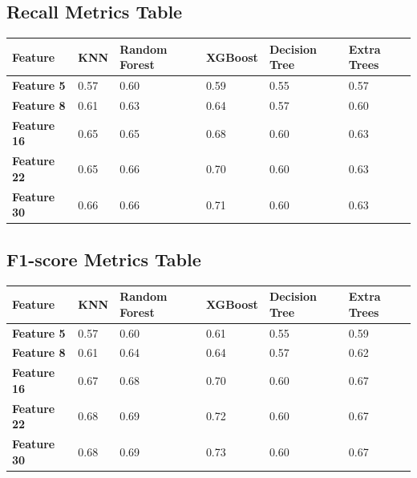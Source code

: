 \documentclass[letterpaper]{article}
\begin{document}
\bigskip

\subsection{Recall Metrics Table}
\begin{flushleft}
\tablefirsthead{}
\tablehead{}
\tabletail{}
\tablelasttail{}
\begin{supertabular}{|m{0.7677598in}|m{0.41085985in}|m{1.0830599in}|m{0.66565984in}|m{0.9497598in}|m{0.8309598in}|}
\hline
{\bfseries Feature} &
{\bfseries KNN} &
{\bfseries Random Forest} &
{\bfseries XGBoost} &
{\bfseries Decision Tree} &
{\bfseries Extra Trees}\\\hline
{\bfseries Feature 5} &
0.57 &
0.60 &
0.59 &
0.55 &
0.57\\\hline
{\bfseries Feature 8} &
0.61 &
0.63 &
0.64 &
0.57 &
0.60\\\hline
{\bfseries Feature 16} &
0.65 &
0.65 &
0.68 &
0.60 &
0.63\\\hline
{\bfseries Feature 22} &
0.65 &
0.66 &
0.70 &
0.60 &
0.63\\\hline
{\bfseries Feature 30} &
0.66 &
0.66 &
0.71 &
0.60 &
0.63\\\hline
\end{supertabular}
\end{flushleft}

\bigskip


\bigskip


\bigskip

\subsection[F1{}-score Metrics Table]{F1-score Metrics Table}
\begin{flushleft}
\tablefirsthead{}
\tablehead{}
\tabletail{}
\tablelasttail{}
\begin{supertabular}{|m{0.7677598in}|m{0.41085985in}|m{1.0830599in}|m{0.66565984in}|m{0.9497598in}|m{0.8309598in}|}
\hline
{\bfseries Feature} &
{\bfseries KNN} &
{\bfseries Random Forest} &
{\bfseries XGBoost} &
{\bfseries Decision Tree} &
{\bfseries Extra Trees}\\\hline
{\bfseries Feature 5} &
0.57 &
0.60 &
0.61 &
0.55 &
0.59\\\hline
{\bfseries Feature 8} &
0.61 &
0.64 &
0.64 &
0.57 &
0.62\\\hline
{\bfseries Feature 16} &
0.67 &
0.68 &
0.70 &
0.60 &
0.67\\\hline
{\bfseries Feature 22} &
0.68 &
0.69 &
0.72 &
0.60 &
0.67\\\hline
{\bfseries Feature 30} &
0.68 &
0.69 &
0.73 &
0.60 &
0.67\\\hline
\end{supertabular}
\end{flushleft}
\end{document}
